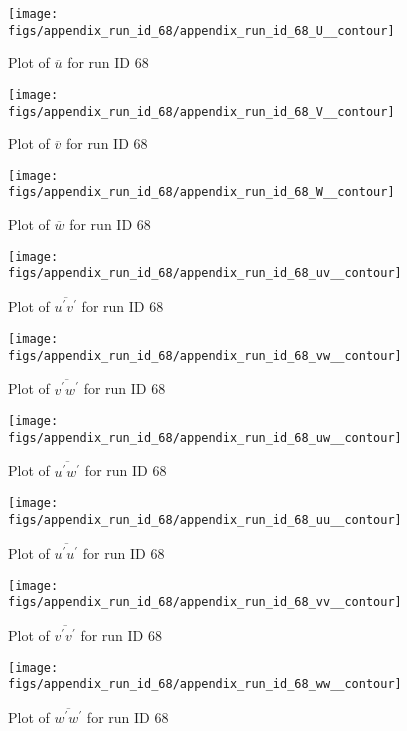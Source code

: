 \begin{figure}[H]
\centering
\texttt{[image: figs/appendix\_run\_id\_68/appendix\_run\_id\_68\_U\_\_contour]}
\caption{Plot of $\overline{u}$ for run ID 68}
\label{fig:appendix_run_id_68_U__contour}
\end{figure}


\begin{figure}[H]
\centering
\texttt{[image: figs/appendix\_run\_id\_68/appendix\_run\_id\_68\_V\_\_contour]}
\caption{Plot of $\overline{v}$ for run ID 68}
\label{fig:appendix_run_id_68_V__contour}
\end{figure}


\begin{figure}[H]
\centering
\texttt{[image: figs/appendix\_run\_id\_68/appendix\_run\_id\_68\_W\_\_contour]}
\caption{Plot of $\overline{w}$ for run ID 68}
\label{fig:appendix_run_id_68_W__contour}
\end{figure}


\begin{figure}[H]
\centering
\texttt{[image: figs/appendix\_run\_id\_68/appendix\_run\_id\_68\_uv\_\_contour]}
\caption{Plot of $\overline{u^\prime v^\prime}$ for run ID 68}
\label{fig:appendix_run_id_68_uv__contour}
\end{figure}


\begin{figure}[H]
\centering
\texttt{[image: figs/appendix\_run\_id\_68/appendix\_run\_id\_68\_vw\_\_contour]}
\caption{Plot of $\overline{v^\prime w^\prime}$ for run ID 68}
\label{fig:appendix_run_id_68_vw__contour}
\end{figure}


\begin{figure}[H]
\centering
\texttt{[image: figs/appendix\_run\_id\_68/appendix\_run\_id\_68\_uw\_\_contour]}
\caption{Plot of $\overline{u^\prime w^\prime}$ for run ID 68}
\label{fig:appendix_run_id_68_uw__contour}
\end{figure}


\begin{figure}[H]
\centering
\texttt{[image: figs/appendix\_run\_id\_68/appendix\_run\_id\_68\_uu\_\_contour]}
\caption{Plot of $\overline{u^\prime u^\prime}$ for run ID 68}
\label{fig:appendix_run_id_68_uu__contour}
\end{figure}


\begin{figure}[H]
\centering
\texttt{[image: figs/appendix\_run\_id\_68/appendix\_run\_id\_68\_vv\_\_contour]}
\caption{Plot of $\overline{v^\prime v^\prime}$ for run ID 68}
\label{fig:appendix_run_id_68_vv__contour}
\end{figure}


\begin{figure}[H]
\centering
\texttt{[image: figs/appendix\_run\_id\_68/appendix\_run\_id\_68\_ww\_\_contour]}
\caption{Plot of $\overline{w^\prime w^\prime}$ for run ID 68}
\label{fig:appendix_run_id_68_ww__contour}
\end{figure}


